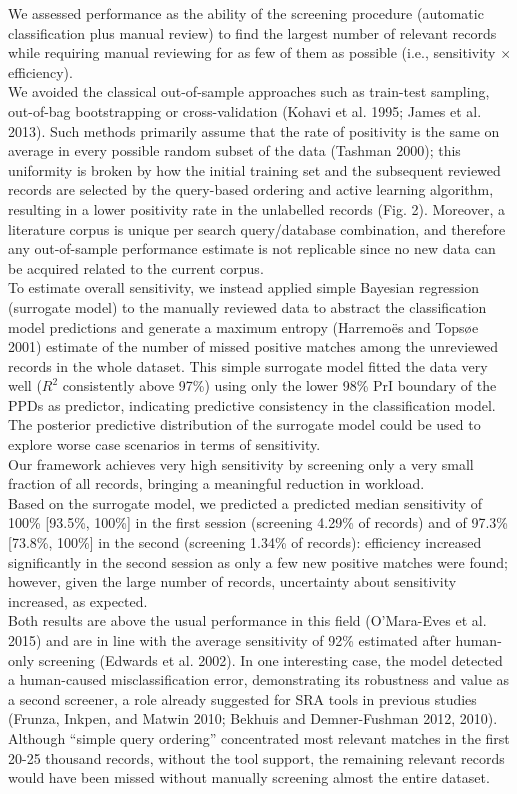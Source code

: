 \documentclass{article}
\begin{document}
We assessed performance as the ability of the screening procedure
(automatic classification plus manual review) to find the largest number
of relevant records while requiring manual reviewing for as few of them
as possible (i.e., sensitivity \(\times\) efficiency).\\
We avoided the classical out-of-sample approaches such as train-test
sampling, out-of-bag bootstrapping or cross-validation (Kohavi et al.
1995; James et al. 2013). Such methods primarily assume that the rate of
positivity is the same on average in every possible random subset of the
data (Tashman 2000); this uniformity is broken by how the initial
training set and the subsequent reviewed records are selected by the
query-based ordering and active learning algorithm, resulting in a lower
positivity rate in the unlabelled records (Fig. 2). Moreover, a
literature corpus is unique per search query/database combination, and
therefore any out-of-sample performance estimate is not replicable since
no new data can be acquired related to the current corpus.\\
To estimate overall sensitivity, we instead applied simple Bayesian
regression (surrogate model) to the manually reviewed data to abstract
the classification model predictions and generate a maximum entropy
(Harremoës and Topsøe 2001) estimate of the number of missed positive
matches among the unreviewed records in the whole dataset. This simple
surrogate model fitted the data very well (\(R^2\) consistently above
97\%) using only the lower 98\% PrI boundary of the PPDs as predictor,
indicating predictive consistency in the classification model. The
posterior predictive distribution of the surrogate model could be used
to explore worse case scenarios in terms of sensitivity.\\

Our framework achieves very high sensitivity by screening only a very
small fraction of all records, bringing a meaningful reduction in
workload.\\
Based on the surrogate model, we predicted a predicted median
sensitivity of 100\% {[}93.5\%, 100\%{]} in the first session (screening
4.29\% of records) and of 97.3\% {[}73.8\%, 100\%{]} in the second
(screening 1.34\% of records): efficiency increased significantly in the
second session as only a few new positive matches were found; however,
given the large number of records, uncertainty about sensitivity
increased, as expected.\\
Both results are above the usual performance in this field (O'Mara-Eves
et al. 2015) and are in line with the average sensitivity of 92\%
estimated after human-only screening (Edwards et al. 2002). In one
interesting case, the model detected a human-caused misclassification
error, demonstrating its robustness and value as a second screener, a
role already suggested for SRA tools in previous studies (Frunza,
Inkpen, and Matwin 2010; Bekhuis and Demner-Fushman 2012, 2010).
Although ``simple query ordering'' concentrated most relevant matches in
the first 20-25 thousand records, without the tool support, the
remaining relevant records would have been missed without manually
screening almost the entire dataset.\\
\end{document}
